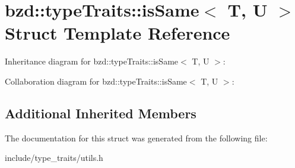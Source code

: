 \hypertarget{structbzd_1_1typeTraits_1_1isSame}{}\section{bzd\+:\+:type\+Traits\+:\+:is\+Same$<$ T, U $>$ Struct Template Reference}
\label{structbzd_1_1typeTraits_1_1isSame}


Inheritance diagram for bzd\+:\+:type\+Traits\+:\+:is\+Same$<$ T, U $>$\+:


Collaboration diagram for bzd\+:\+:type\+Traits\+:\+:is\+Same$<$ T, U $>$\+:
\subsection*{Additional Inherited Members}


The documentation for this struct was generated from the following file\+:\begin{DoxyCompactItemize}
\item 
include/type\+\_\+traits/utils.\+h\end{DoxyCompactItemize}
